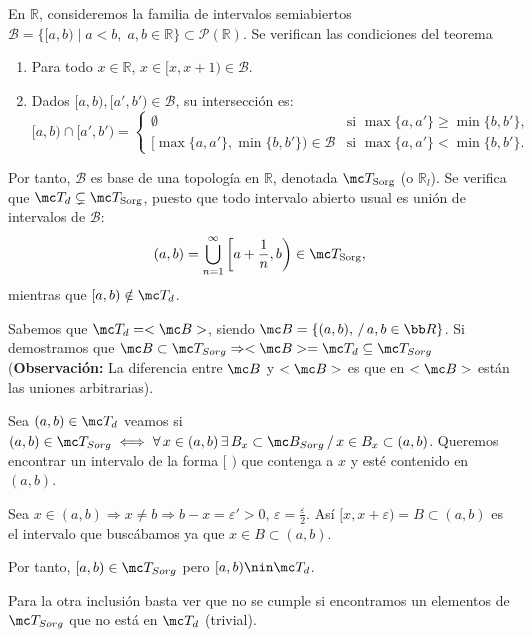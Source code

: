 \begin{ejer}
En \(\mathbb{R}\), consideremos la familia de intervalos semiabiertos \(\mathcal{B} = \{[a, b) \mid a < b, \; a, b \in \mathbb{R}\} \subset \mathcal{P}(\mathbb{R})\). Se verifican las condiciones del teorema
\begin{enumerate}
    \item[\textbf{1)}] Para todo \(x \in \mathbb{R}\), \(x \in [x, x+1) \in \mathcal{B}\).
    \item[\textbf{2)}] Dados \([a, b), [a', b') \in \mathcal{B}\), su intersección es:
    \[
        [a, b) \cap [a', b') = \begin{cases} \emptyset & \text{si } \max\{a, a'\} \ge \min\{b, b'\}, \\ [\max\{a, a'\}, \min\{b, b'\}) \in \mathcal{B} & \text{si } \max\{a, a'\} < \min\{b, b'\}. \end{cases} \text{}
    \]
\end{enumerate}
Por tanto, \(\mathcal{B}\) es base de una topología en \(\mathbb{R}\), denotada \(\mc T_{\text{Sorg}}\) (o \(\mathbb{R}_l\)). Se verifica que \(\mc T_d \subsetneq \mc T_{\text{Sorg}}\), puesto que todo intervalo abierto usual es unión de intervalos de \(\mathcal{B}\):
\[
    (a, b) = \bigcup_{n=1}^\infty \left[a + \frac{1}{n}, b\right) \in \mc T_{\text{Sorg}} \text{},
\]
mientras que \([a, b) \notin \mc T_d\).

Sabemos que $\mc T_d=<\mc B>$, siendo $\mc B=\{(a,b), \, / \,  a,b \in \bb R\}$. Si demostramos que $\mc B \subset \mc T_{Sorg}\Rightarrow <\mc B>=\mc T_d \subseteq \mc T_{Sorg}$ (\textbf{Observaci\'on:} La diferencia entre $\mc B$ y $<\mc B>$ es que en $<\mc B>$ est\'an las uniones arbitrarias). 

Sea $(a,b)\in \mc T_d$ veamos si $(a,b)\in \mc T_{Sorg} \iff \forall \, x\in (a,b) \, \exists \, B_x\subset \mc B_{Sorg}\, / \, x\in B_x \subset(a,b)$. Queremos encontrar un intervalo de la forma $[\,\,)$ que contenga a $x$ y est\'e contenido en $(a,b)$. 

Sea $x\in (a,b) \Rightarrow x\neq b \Rightarrow b-x = \varepsilon'>0, \, \varepsilon = \frac{\varepsilon}{2}$. As\'i $[x,x+\varepsilon)=B\subset (a,b)$ es el intervalo que busc\'abamos ya que $x\in B \subset(a,b)$. 

Por tanto, $[a,b) \in \mc T_{Sorg}$ pero $[a,b)\nin \mc T_d$.

Para la otra inclusi\'on basta ver que no se cumple si encontramos un elementos de $\mc T_{Sorg}$ que no est\'a en $\mc T_d$ (trivial). 
\end{ejer}
